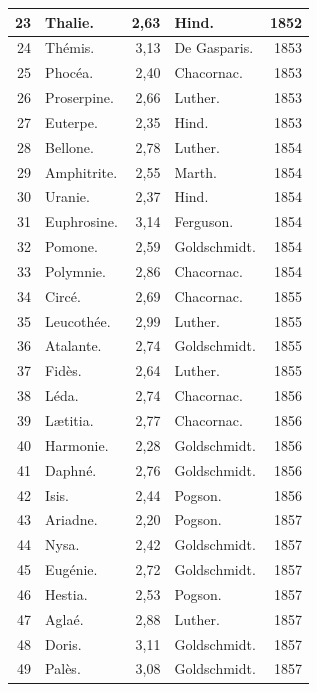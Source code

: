 \documentclass[a4paper, 11pt, oneside]{article}
\begin{document}
\begin{center}
\begin{longtable}{|r|l|r|l|r|}
        23 & Thalie. & 2,63 & Hind. & 1852 \\ \hline
        24 & Thémis. & 3,13 & De Gasparis. & 1853 \\ \hline
        25 & Phocéa. & 2,40 & Chacornac. & 1853 \\ \hline
        26 & Proserpine. & 2,66 & Luther. & 1853 \\ \hline
        27 & Euterpe. & 2,35 & Hind. & 1853 \\ \hline
        28 & Bellone. & 2,78 & Luther. & 1854 \\ \hline
        29 & Amphitrite. & 2,55 & Marth. & 1854 \\ \hline
        30 & Uranie. & 2,37 & Hind. & 1854 \\ \hline
        31 & Euphrosine. & 3,14 & Ferguson. & 1854 \\ \hline
        32 & Pomone. & 2,59 & Goldschmidt. & 1854 \\ \hline
        33 & Polymnie. & 2,86 & Chacornac. & 1854 \\ \hline
        34 & Circé. & 2,69 & Chacornac. & 1855 \\ \hline
        35 & Leucothée. & 2,99 & Luther. & 1855 \\ \hline
        36 & Atalante. & 2,74 & Goldschmidt. & 1855 \\ \hline
        37 & Fidès. & 2,64 & Luther. & 1855 \\ \hline
        38 & Léda. & 2,74 & Chacornac. & 1856 \\ \hline
        39 & Lætitia. & 2,77 & Chacornac. & 1856 \\ \hline
        40 & Harmonie. & 2,28 & Goldschmidt. & 1856 \\ \hline
        41 & Daphné. & 2,76 & Goldschmidt. & 1856 \\ \hline
        42 & Isis. & 2,44 & Pogson. & 1856 \\ \hline
        43 & Ariadne. & 2,20 & Pogson. & 1857 \\ \hline
        44 & Nysa. & 2,42 & Goldschmidt. & 1857 \\ \hline
        45 & Eugénie. & 2,72 & Goldschmidt. & 1857 \\ \hline
        46 & Hestia. & 2,53 & Pogson. & 1857 \\ \hline
        47 & Aglaé. & 2,88 & Luther. & 1857 \\ \hline
        48 & Doris. & 3,11 & Goldschmidt. & 1857 \\ \hline
        49 & Palès. & 3,08 & Goldschmidt. & 1857 \\ \hline

\end{longtable}
\end{center}
\end{document}

